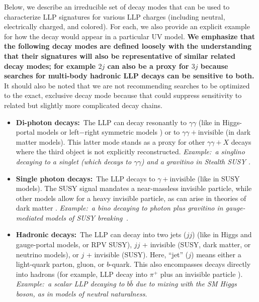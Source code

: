 Below, we describe an irreducible set of decay modes that can be used to
characterize LLP signatures for various LLP charges (including neutral, electrically charged, and colored). For each, we also provide an explicit example for how the decay would appear in a particular UV model. {\bf We  emphasize that the following decay modes are defined
  loosely with the understanding that their signatures will also be representative of similar related decay modes; for example
  $2j$ can also be a proxy for $3j$ because searches for
  multi-body hadronic LLP decays can be sensitive to both.} It
should also be noted that we are not recommending searches to be
optimized to the exact, exclusive decay mode because that could
suppress sensitivity to related but slightly more complicated decay chains.


\begin{itemize}
\item {\bf Di-photon decays:}~The LLP can decay resonantly to
  $\gamma\gamma$ (like in Higgs-portal models or left$-$right symmetric models
  \cite{Dev:2016vle}) or to
  $\gamma\gamma+\mathrm{invisible}$ (in dark matter models). This
  latter mode stands as a proxy for other $\gamma\gamma+X$ decays
  where the third object is not explicitly reconstructed. \emph{Example:~a 
  singlino decaying to a singlet (which decays to $\gamma\gamma$) and 
  a gravitino in Stealth SUSY \cite{Fan:2011yu}.}

\item {\bf Single photon decays:}~The LLP decays to
  $\gamma+\mathrm{invisible}$ (like in SUSY models).  The SUSY signal mandates a
  near-massless invisible particle, while other models allow for
  a heavy invisible particle, as can arise in theories of dark matter
  \cite{Weiner:2012cb,Primulando:2015lfa}. \emph{Example:~a bino decaying to photon plus gravitino in gauge-mediated
  models of SUSY breaking~\cite{Dimopoulos:1996yq}.}

\item {\bf Hadronic decays:}~The LLP can decay into two jets ($jj$)
  (like in Higgs and gauge-portal models, or RPV SUSY), $jj$ +
  invisible (SUSY, dark matter, or neutrino models), or $j$ +
  invisible (SUSY). Here, ``jet'' ($j$) means either a light-quark parton,
  gluon, or $b$-quark. This also encompasses decays directly into
  hadrons (for example, LLP decay into $\pi^+$ plus an invisible 
  particle  \cite{Chen:1995yu,Thomas:1998wy,Feng:1999fu}).
   \emph{Example:~a scalar LLP decaying to $b\bar{b}$
  due to mixing with the SM Higgs boson, as in models of
  neutral naturalness}. 


\end{itemize}

